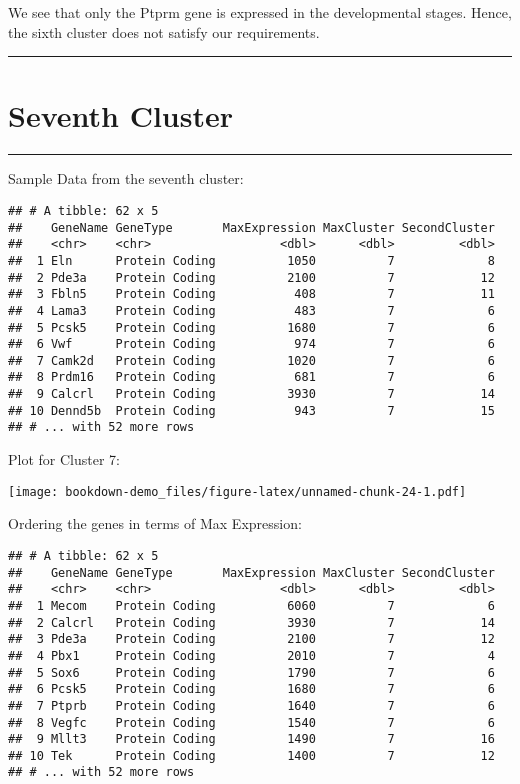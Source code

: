 \documentclass[
]{book}
\begin{document}
We see that only the Ptprm gene is expressed in the developmental stages. Hence, the sixth cluster does not satisfy our requirements.

\begin{center}\rule{0.5\linewidth}{0.5pt}\end{center}

\hypertarget{seventh-cluster}{%
\chapter{Seventh Cluster}\label{seventh-cluster}}

\begin{center}\rule{0.5\linewidth}{0.5pt}\end{center}

Sample Data from the seventh cluster:

\begin{verbatim}
## # A tibble: 62 x 5
##    GeneName GeneType       MaxExpression MaxCluster SecondCluster
##    <chr>    <chr>                  <dbl>      <dbl>         <dbl>
##  1 Eln      Protein Coding          1050          7             8
##  2 Pde3a    Protein Coding          2100          7            12
##  3 Fbln5    Protein Coding           408          7            11
##  4 Lama3    Protein Coding           483          7             6
##  5 Pcsk5    Protein Coding          1680          7             6
##  6 Vwf      Protein Coding           974          7             6
##  7 Camk2d   Protein Coding          1020          7             6
##  8 Prdm16   Protein Coding           681          7             6
##  9 Calcrl   Protein Coding          3930          7            14
## 10 Dennd5b  Protein Coding           943          7            15
## # ... with 52 more rows
\end{verbatim}

Plot for Cluster 7:

\texttt{[image: bookdown-demo\_files/figure-latex/unnamed-chunk-24-1.pdf]}

Ordering the genes in terms of Max Expression:

\begin{verbatim}
## # A tibble: 62 x 5
##    GeneName GeneType       MaxExpression MaxCluster SecondCluster
##    <chr>    <chr>                  <dbl>      <dbl>         <dbl>
##  1 Mecom    Protein Coding          6060          7             6
##  2 Calcrl   Protein Coding          3930          7            14
##  3 Pde3a    Protein Coding          2100          7            12
##  4 Pbx1     Protein Coding          2010          7             4
##  5 Sox6     Protein Coding          1790          7             6
##  6 Pcsk5    Protein Coding          1680          7             6
##  7 Ptprb    Protein Coding          1640          7             6
##  8 Vegfc    Protein Coding          1540          7             6
##  9 Mllt3    Protein Coding          1490          7            16
## 10 Tek      Protein Coding          1400          7            12
## # ... with 52 more rows
\end{verbatim}
\end{document}
